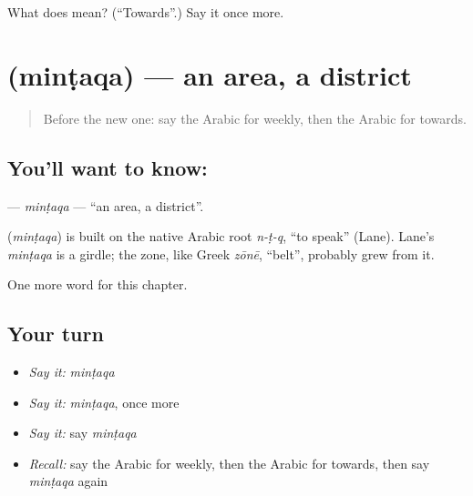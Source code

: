 \begin{tcolorbox}[breakable,colback=teal!4,colframe=teal!35!black,title={Before you move on}]
What does  mean? (\textquotedblleft{}Towards\textquotedblright{}.) Say it once more.
\end{tcolorbox}
\section[\texorpdfstring{\ar{منطقة} (minṭaqa)}{منطقة (minṭaqa)}]{ (minṭaqa) — an area, a district}

\label{lesson:AR-C204-mintaqa}



\begin{quote}
Before the new one: say the Arabic for weekly, then the Arabic for towards.
\end{quote}

\subsection*{You'll want to know: }
\textbf{} — \emph{minṭaqa} — \textquotedblleft{}an area, a district\textquotedblright{}.

\begin{cousinweb}
\textbf{} (\emph{minṭaqa}) is built on the native Arabic root \emph{n-ṭ-q}, \textquotedblleft{}to speak\textquotedblright{} (Lane). Lane's \emph{minṭaqa} is a girdle; the zone, like Greek \emph{zōnē}, \textquotedblleft{}belt\textquotedblright{}, probably grew from it.
\end{cousinweb}

\begin{grammarlens}[title={What you've built}]
One more word for this chapter.
\end{grammarlens}

\subsection*{Your turn}
\begin{itemize}
\raggedright
  \item \emph{Say it:} \emph{minṭaqa}
  \item \emph{Say it:} \emph{minṭaqa}, once more
  \item \emph{Say it:} say \emph{minṭaqa}
  \item \emph{Recall:} say the Arabic for weekly, then the Arabic for towards, then say \emph{minṭaqa} again
\end{itemize}

